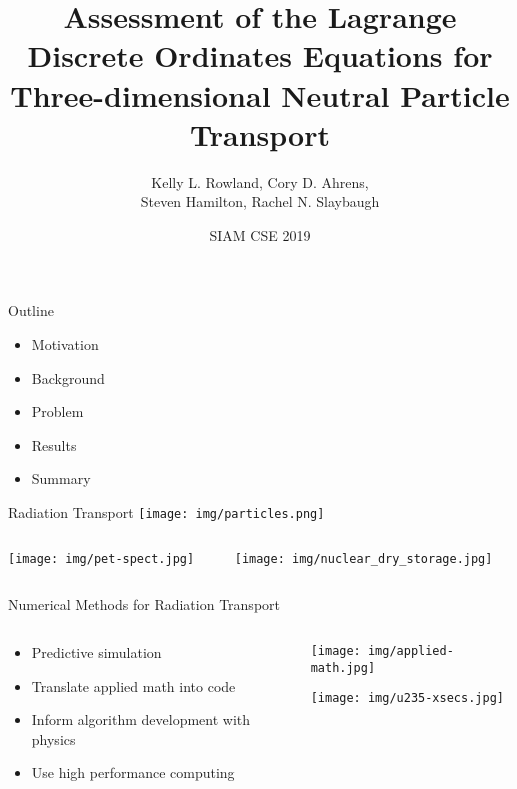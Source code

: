 \documentclass[handout]{beamer} %
\title[Assessment of the LDO Equations for 3D Neutral Particle Transport]
{Assessment of the Lagrange Discrete Ordinates Equations for Three-dimensional Neutral Particle Transport}
\author[Kelly L. Rowland et al.]{Kelly L. Rowland, Cory D. Ahrens, \\Steven Hamilton, Rachel N. Slaybaugh}
\date{SIAM CSE 2019}
\begin{document}
\begin{frame}[plain]
	\titlepage
\end{frame}

\begin{frame}{Outline}
  \begin{itemize}
  \item{Motivation}
  \item{Background}
  \item{Problem}
  \item{Results}
  \item{Summary}
  \end{itemize}
\end{frame}

\begin{frame}{Radiation Transport}
%
\pause
%
\center
\texttt{[image: img/particles.png]}
%
\pause
%
\begin{columns}
\begin{column}{0.5\textwidth}
\center
\texttt{[image: img/pet-spect.jpg]}
\end{column}
\begin{column}{0.5\textwidth}
\center
\texttt{[image: img/nuclear\_dry\_storage.jpg]}
\end{column}
\end{columns}
%
\end{frame}

\begin{frame}{Numerical Methods for Radiation Transport}
%
\begin{columns}
\begin{column}{0.5\textwidth}
\begin{itemize}
\item{Predictive simulation}
\item{Translate applied math into code}
\item{Inform algorithm development with physics}
\item{Use high performance computing}
\end{itemize}
\end{column}
\begin{column}{0.5\textwidth}
\center
\texttt{[image: img/applied-math.jpg]}

\texttt{[image: img/u235-xsecs.jpg]}
\end{column}
\end{columns}
%
\end{frame}
\end{document}
